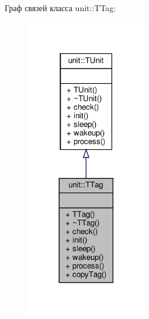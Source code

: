 Граф связей класса unit\+:\+:T\+Tag\+:\nopagebreak
\begin{figure}[H]
\begin{center}
\leavevmode
\includegraphics[width=149pt]{classunit_1_1_t_tag__coll__graph}
\end{center}
\end{figure}
